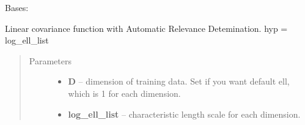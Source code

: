 \documentclass[letterpaper,10pt,english]{sphinxmanual}
\begin{document}
\begin{fulllineitems}
\label{pyGPs.Core:pyGPs.Core.cov.LINard}
Bases: 

Linear covariance function with Automatic Relevance Detemination.
hyp = log\_ell\_list
\begin{quote}\begin{description}
\item[{Parameters}] \leavevmode\begin{itemize}
\item {} 
\textbf{D} -- dimension of training data. Set if you want default ell, which is 1 for each dimension.

\item {} 
\textbf{log\_ell\_list} -- characteristic length scale for each dimension.

\end{itemize}

\end{description}\end{quote}

\begin{fulllineitems}
\label{pyGPs.Core:pyGPs.Core.cov.LINard.getCovMatrix}
\end{fulllineitems}


\begin{fulllineitems}
\label{pyGPs.Core:pyGPs.Core.cov.LINard.getDerMatrix}
\end{fulllineitems}


\end{fulllineitems}

\end{document}
